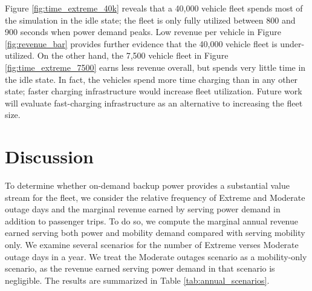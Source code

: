 \documentclass[conference]{IEEEtran}
\begin{document}
Figure \ref{fig:time_extreme_40k} reveals that a 40,000 vehicle fleet spends most of the simulation in the idle state; the fleet is only fully utilized between 800 and 900 seconds when power demand peaks. Low revenue per vehicle in Figure \ref{fig:revenue_bar} provides further evidence that the 40,000 vehicle fleet is under-utilized. On the other hand, the 7,500 vehicle fleet in Figure \ref{fig:time_extreme_7500} earns less revenue overall, but spends very little time in the idle state. In fact, the vehicles spend more time charging than in any other state; faster charging infrastructure would increase fleet utilization. Future work will evaluate fast-charging infrastructure as an alternative to increasing the fleet size.
\section{Discussion}
To determine whether on-demand backup power provides a substantial value stream for the fleet, we consider the relative frequency of Extreme and Moderate outage days and the marginal revenue earned by serving power demand in addition to passenger trips. To do so, we compute the marginal annual revenue earned serving both power and mobility demand compared with serving mobility only. We examine several scenarios for the number of Extreme verses Moderate outage days in a year. We treat the Moderate outages scenario as a mobility-only scenario, as the revenue earned serving power demand in that scenario is negligible. The results are summarized in Table \ref{tab:annual_scenarios}.
\end{document}

